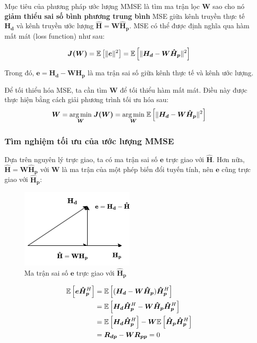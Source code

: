 Mục tiêu của phương pháp ước lượng MMSE là tìm ma trận lọc \( \bm{W} \) 
sao cho nó \textbf{giảm thiểu sai số bình phương trung bình} MSE giữa kênh truyền thực tế \( \bm{H_d} \) 
và kênh truyền ước lượng \( \bm{\hat{H}} = \bm{W}\bm{\hat{H}_p} \). 
MSE có thể được định nghĩa qua hàm mất mát (loss function) như sau:

\begin{equation}
    \bm{J(W)} 
    = \mathbb{E} \left[ \| \bm{e} \|^2 \right]
    = \mathbb{E} \left[ \| \bm{H_d} - \bm{W}\bm{\hat{H}_p} \|^2 \right]
\end{equation}

Trong đó, \( \bm{e} = \bm{H_d} - \bm{W}\bm{\hat{H}_p} \) là ma trận sai số giữa kênh thực tế và kênh ước lượng.

Để tối thiểu hóa MSE, ta cần tìm \( \bm{W} \) để tối thiểu hàm mất mát. 
Điều này được thực hiện bằng cách giải phương trình tối ưu hóa sau:
%
\begin{equation}
    \bm{W} 
    = \underset{\bm{W}}{\arg \min} \; \bm{J(W)}
    = \underset{\bm{W}}{\arg \min} \; \mathbb{E} \left[ \| \bm{H_d} - \bm{W}\bm{\hat{H}_p} \|^2 \right]
\end{equation}

\subsubsection{Tìm nghiệm tối ưu của ước lượng MMSE}

Dựa trên nguyên lý trực giao, ta có ma trận sai số \( \bm{e} \) trực giao với \( \bm{\hat{H}} \). 
Hơn nữa, \( \bm{\hat{H}} = \bm{W}\bm{\hat{H}_p} \) với \( \bm{W} \) là ma trận của một phép biến đổi tuyến tính, nên \( \bm{e} \) cũng trực giao với \( \bm{\hat{H}_p} \):

\begin{figure}[H]
    \centering
    \includegraphics[width=.4\textwidth]{../images/mmse_orthogonal.png}
    \caption{Ma trận sai số \( \bm{e} \) trực giao với \( \bm{\hat{H}_p} \)}
\end{figure}

\begin{align*}
    \mathbb{E} \left[ \bm{e} \bm{\hat{H}_p}^H \right] 
    &= \mathbb{E} \left[ (\bm{H_d} - \bm{W}\bm{\hat{H}_p}) \bm{\hat{H}_p}^H \right] \\
    &= \mathbb{E} \left[ \bm{H_d}\bm{\hat{H}_p}^H - \bm{W}\bm{\hat{H}_p}\bm{\hat{H}_p}^H \right] \\
    &= \mathbb{E} \left[ \bm{H_d}\bm{\hat{H}_p}^H \right] - \bm{W}\mathbb{E} \left[ \bm{\hat{H}_p}\bm{\hat{H}_p}^H \right] \\
    &= \bm{R_{dp}} - \bm{W}\bm{R_{pp}} = 0
\end{align*}

